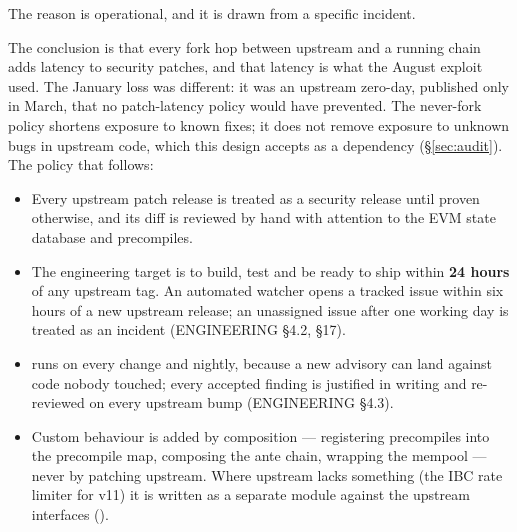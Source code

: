 The reason is operational, and it is drawn from a specific incident.

The conclusion is that every fork hop between upstream and a running chain adds
latency to security patches, and that latency is what the August exploit
used. The January loss was different: it was an upstream zero-day, published
only in March, that no patch-latency policy would have prevented. The
never-fork policy shortens exposure to known fixes; it does not remove
exposure to unknown bugs in upstream code, which this design accepts as a
dependency (\S\ref{sec:audit}). The policy that follows:

\begin{itemize}
\item Every upstream patch release is treated as a security release until
  proven otherwise, and its diff is reviewed by hand with attention to the EVM
  state database and precompiles.
\item The engineering target is to build, test and be ready to ship within
  \textbf{24 hours} of any upstream tag. An automated watcher opens a tracked
  issue within six hours of a new upstream release; an unassigned issue after
  one working day is treated as an incident (ENGINEERING \S4.2, \S17).
\item {} runs on every change and nightly, because a new
  advisory can land against code nobody touched; every accepted finding is
  justified in writing and re-reviewed on every upstream bump (ENGINEERING \S4.3).
\item Custom behaviour is added by composition --- registering precompiles into
  the precompile map, composing the ante chain, wrapping the mempool --- never by
  patching upstream. Where upstream lacks something (the IBC rate limiter for
   v11) it is written as a separate module against the upstream
  interfaces ().
\end{itemize}

